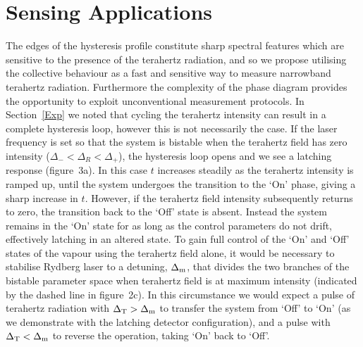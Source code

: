 \documentclass[twocolumn,aps,prl,nobibnotes,8pt]{revtex4-1}
\begin{document}
\section{Sensing Applications}
\label{Sense}

\noindent
The edges of the hysteresis profile constitute sharp spectral features which are sensitive to the presence of the terahertz radiation, and so we propose utilising the collective behaviour as a fast and sensitive way to measure narrowband terahertz radiation.
Furthermore the complexity of the phase diagram provides the opportunity to exploit unconventional measurement protocols. 
In Section~\ref{Exp} we noted that cycling the terahertz intensity can result in a complete hysteresis loop, however this is not necessarily the case.
If the laser frequency is set so that the system is bistable when the terahertz field has zero intensity ($\Delta_- < \Delta_R < \Delta_+$), the hysteresis loop opens and we see a latching response (figure~3a).
In this case $t$ increases steadily as the terahertz intensity is ramped up, until the system undergoes the transition to the `On' phase, giving a sharp increase in $t$.
However, if the terahertz field intensity subsequently returns to zero, the transition back to the `Off' state  is absent.
Instead the system remains in the `On' state for as long as the control parameters do not drift, effectively latching in an altered state.
To gain full control of the `On' and `Off' states of the vapour using the terahertz field alone, it would be necessary to stabilise Rydberg laser to a detuning, $\Delta_{\rm{m}}$, that divides the two branches of the bistable parameter space when terahertz field is at maximum intensity (indicated by the dashed line in figure~2c). 
In this circumstance we would expect a pulse of terahertz radiation with $\Delta_{\rm{T}} > \Delta_{\rm{m}}$ to transfer the system from `Off' to `On' (as we demonstrate with the latching detector configuration), and a pulse with $\Delta_{\rm{T}} < \Delta_{\rm{m}}$ to reverse the operation, taking `On' back to `Off'.
\end{document}
